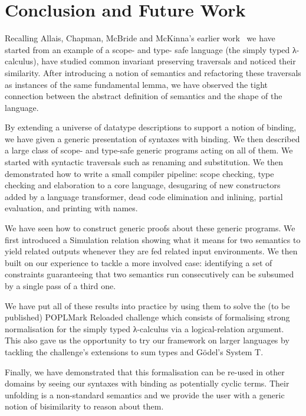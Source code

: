 {\section{Conclusion and Future Work}

Recalling Allais, Chapman, McBride and McKinna's earlier work~\citeyear{allais2017type}
we have started from an example of a scope- and type- safe language (the simply typed
λ-calculus), have studied common invariant preserving traversals and noticed their
similarity. After introducing a notion of semantics and refactoring these traversals as
instances of the same fundamental lemma, we have observed the tight
connection between the abstract definition of semantics and the shape of the
language.

By extending a universe of datatype descriptions to support a notion of binding,
we have given a generic presentation of syntaxes with binding. We then described
a large class of scope- and type-safe generic programs acting on all of them.
We started with syntactic traversals such as renaming and substitution. We then
demonstrated how to write a small compiler pipeline: scope checking, type checking
and elaboration to a core language, desugaring of new constructors added by a language
transformer, dead code elimination and inlining, partial evaluation, and printing
with names.

We have seen how to construct generic proofs about these generic programs. We
first introduced a Simulation relation showing what it means for two semantics
to yield related outputs whenever they are fed related input environments. We
then built on our experience to tackle a more involved case: identifying a set
of constraints guaranteeing that two semantics run consecutively can be subsumed
by a single pass of a third one.

We have put all of these results into practice by using them to solve the (to be
published) POPLMark Reloaded challenge which consists of formalising strong
normalisation for the simply typed λ-calculus via a logical-relation
argument. This also gave us the opportunity to try our framework on larger
languages by tackling the challenge's extensions to sum types and G\"{o}del's
System T.

Finally, we have demonstrated that this formalisation can be re-used
in other domains by seeing our syntaxes with binding as potentially cyclic
terms. Their unfolding is a non-standard semantics and we provide the
user with a generic notion of bisimilarity to reason about them.

}

